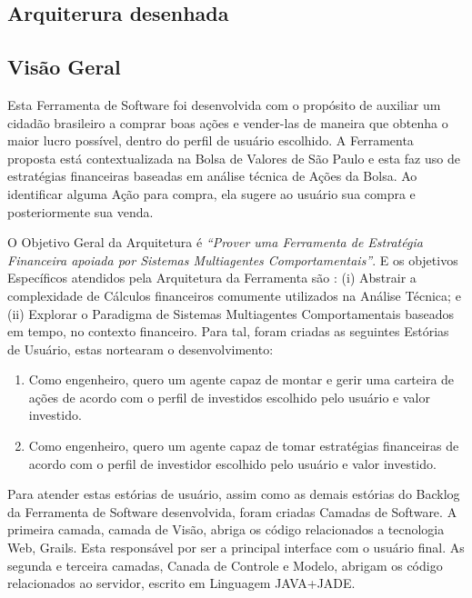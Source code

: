 \begin{apendicesenv}
\section{Arquiterura desenhada}
\subsection{Visão Geral}

Esta Ferramenta de Software foi desenvolvida com o propósito de auxiliar um cidadão brasileiro a comprar boas ações e vender-las de maneira que obtenha o maior lucro possível, dentro do perfil de usuário escolhido. A Ferramenta proposta está contextualizada na Bolsa de Valores de São Paulo e esta faz uso de estratégias financeiras baseadas em análise técnica de Ações da Bolsa. Ao identificar alguma Ação para compra, ela sugere ao usuário sua compra e posteriormente sua venda. 

O Objetivo Geral da Arquitetura é \textit{“Prover uma Ferramenta de Estratégia Financeira apoiada por Sistemas Multiagentes Comportamentais”}. E os objetivos Específicos atendidos pela Arquitetura da Ferramenta são : (i) Abstrair a complexidade de Cálculos financeiros comumente utilizados na Análise Técnica; e (ii) Explorar o Paradigma de Sistemas Multiagentes Comportamentais baseados em tempo, no contexto financeiro. Para tal, foram criadas as seguintes Estórias de Usuário, estas nortearam o desenvolvimento:

\begin{enumerate}

	\item Como engenheiro, quero um agente capaz de montar e gerir uma carteira de ações de acordo com o perfil de investidos escolhido pelo usuário e valor investido. 
	\item Como engenheiro, quero um agente capaz de tomar estratégias financeiras de acordo com o perfil de investidor escolhido pelo usuário e valor investido.
\end{enumerate}

Para atender estas estórias de usuário, assim como as demais estórias do Backlog da Ferramenta de Software desenvolvida, foram criadas Camadas de Software. A primeira camada, camada de Visão, abriga os código relacionados a tecnologia Web, Grails. Esta responsável por ser a principal interface com o usuário final. As segunda  e terceira camadas, Canada de Controle e Modelo, abrigam os código relacionados ao servidor, escrito em Linguagem JAVA+JADE. 


\end{apendicesenv}
